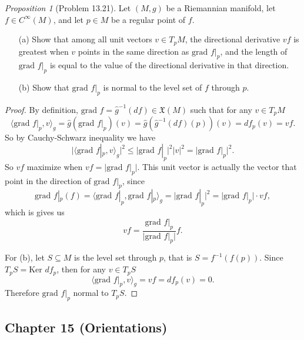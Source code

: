 \documentclass[a4paper]{article}
\theoremstyle{remark}
\newtheorem{prop}{Proposition}
\newcommand{\subhim}{\subseteq} %
\newcommand{\CM}{C^{\infty}(M)} %
\newcommand{\VF}{\mathfrak{X}} %
\begin{document}
\begin{prop}[Problem 13.21]
Let $(M,g)$ be a Riemannian manifold, let $f \in \CM$, and let $p\in M$ be a regular point of $f$.
\begin{enumerate}[nolistsep]
\item[(a)] Show that among all unit vectors $v \in T_pM$, the directional derivative $vf$ is greatest when $v$ points in the same direction as $\text{grad }f|_p$, and the length of $\text{grad }f|_p$ is equal to the value of the directional derivative in that direction.
\item[(b)] Show that $\text{grad }f|_p$ is normal to the level set of $f$ through $p$. 
\end{enumerate}
\end{prop}
\begin{proof}
By definition, $\text{grad }f = \widehat{g}^{-1} (df) \in \VF(M)$ such that for any $v \in T_pM$
$$
\langle \text{grad }f|_p, v\rangle_g = \widehat{g}(\text{grad }f|_p) (v) = \widehat{g}(\widehat{g}^{-1}(df)(p)) (v) = df_p(v) = vf.
$$
So by Cauchy-Schwarz inequality we have
$$
 \big|\langle\text{grad }f|_p, v\rangle_g\big|^2 \leq \big|\text{grad }f|_p\big|^2 \big|v\big|^2 = \big|\text{grad }f|_p\big|^2.
$$
So $vf$ maximize when $vf = \big|\text{grad }f|_p\big|$. This unit vector is actually the vector that point in the direction of $\text{grad }f|_p$, since
$$
\text{grad }f|_p (f) = \langle \text{grad }f|_p,\text{grad }f|_p \rangle_g = \big|\text{grad }f|_p\big|^2 = \big|\text{grad }f|_p\big| \cdot vf, 
$$
which is gives us 
$$
vf = \frac{\text{grad }f|_p}{\big|\text{grad }f|_p\big|} f.
$$ 

For (b), let $S\subhim M$ is the level set through $p$, that is $S = f^{-1}(f(p))$. Since $T_pS = \text{Ker }df_p$, then for any $v \in T_pS$
$$
 \langle \text{grad }f|_p,v \rangle_g = vf = df_p(v) = 0.
$$
Therefore $ \text{grad }f|_p$ normal to $T_pS$.
\end{proof}

\subsection{Chapter 15 (Orientations)}
\end{document}

